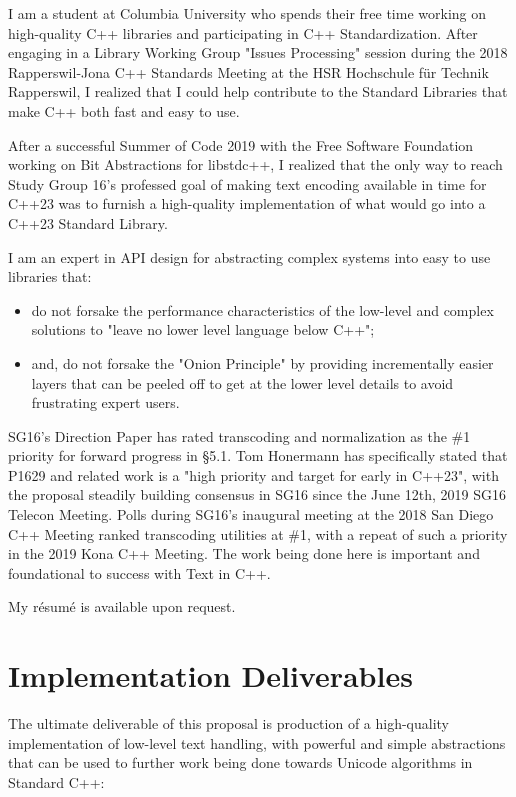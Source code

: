 \documentclass{wg21}
\begin{document}
I am a student at Columbia University who spends their free time working on high-quality C++ libraries\cite{sol2} and participating in C++ Standardization\cite{c++_standardization}. After engaging in a Library Working Group "Issues Processing" session during the 2018 Rapperswil-Jona C++ Standards Meeting at the HSR Hochschule für Technik Rapperswil, I realized that I could help contribute to the Standard Libraries that make C++ both fast and easy to use.

After a successful Summer of Code 2019 with the Free Software Foundation working on Bit Abstractions for libstdc++\cite{c++_gsoc_2019}, I realized that the only way to reach Study Group 16's professed goal of making text encoding available in time for C++23 was to furnish a high-quality implementation of what would go into a C++23 Standard Library.

I am an expert in API design for abstracting complex systems into easy to use libraries that:

\begin{itemize}
	\item do not forsake the performance characteristics of the low-level and complex solutions to "leave no lower level language below C++";
	\item and, do not forsake the "Onion Principle" by providing incrementally easier layers that can be peeled off to get at the lower level details to avoid frustrating expert users.
\end{itemize}

SG16's Direction Paper\cite{p1238} has rated transcoding and normalization as the \#1 priority for forward progress in §5.1. Tom Honermann has specifically stated that P1629 and related work is a "high priority and target for early in C++23", with the proposal steadily building consensus in SG16 since the June 12th, 2019 SG16 Telecon Meeting\cite{sg16_telecon_june_12_2019}. Polls during SG16's inaugural meeting at the 2018 San Diego C++ Meeting ranked transcoding utilities at \#1, with a repeat of such a priority in the 2019 Kona C++ Meeting. The work being done here is important and foundational to success with Text in C++.

My résumé is available upon request.


\section[deliverables]{Implementation Deliverables}

The ultimate deliverable of this proposal is production of a high-quality implementation of low-level text handling, with powerful and simple abstractions that can be used to further work being done towards Unicode algorithms in Standard C++:
\end{document}
